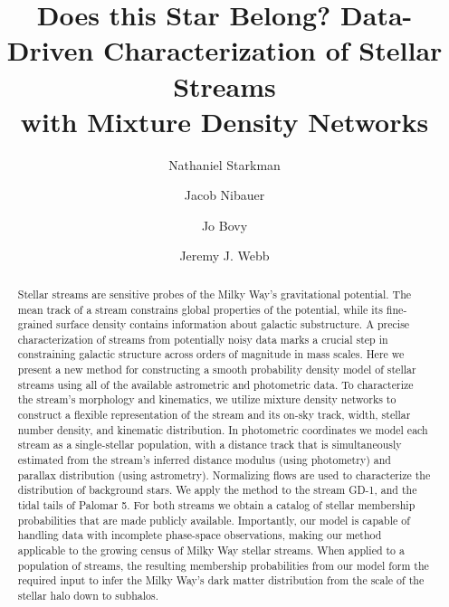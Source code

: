 \documentclass[twocolumn]{aastex631}
\newcommand{\stream}[1]{#1}
\begin{document}
\title{Does this Star Belong? Data-Driven Characterization of Stellar Streams \\ with Mixture Density Networks}

\author[0000-0003-3954-3291]{Nathaniel Starkman}

\author[0000-0001-8042-5794]{Jacob Nibauer}

\author[0000-0001-6855-442X]{Jo Bovy}

\author[0000-0003-3613-0854]{Jeremy J. Webb}




\begin{abstract}
    Stellar streams are sensitive probes of the Milky Way's gravitational
    potential. The mean track of a stream constrains global properties of the
    potential, while its fine-grained surface density contains information about
    galactic substructure. A precise characterization of streams from potentially noisy data marks a crucial step in constraining galactic structure across orders of magnitude in mass scales. Here we present a new method for constructing a smooth probability
    density model of stellar streams using all of the available astrometric and
    photometric data. To characterize the stream's morphology and kinematics, we
    utilize mixture density networks to construct a flexible representation of
    the stream and its on-sky track, width, stellar number density, and
    kinematic distribution. In photometric coordinates we model each stream as a
    single-stellar population, with a distance track that is simultaneously
    estimated from the stream's inferred distance modulus (using photometry) and
    parallax distribution (using astrometry). Normalizing flows are used to characterize the distribution of background stars. We apply the method to the stream
    \stream{GD-1}, and the tidal tails of \stream{Palomar 5}. For both streams we obtain a catalog
    of stellar membership probabilities that are made publicly available.
    Importantly, our model is capable of handling data with incomplete
    phase-space observations, making our method applicable to the growing census
    of Milky Way stellar streams. When applied to a population of streams, the
    resulting membership probabilities from our model form the required input to
    infer the Milky Way's dark matter distribution from the scale of the stellar
    halo down to subhalos. 
\end{abstract}
\end{document}

